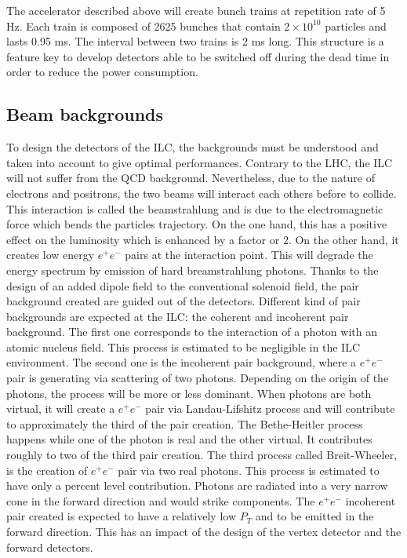     The accelerator described above will create bunch trains at repetition rate of 5 Hz. 
    Each train is composed of 2625 bunches that contain $2\times 10^{10}$ particles and lasts 0.95 ms. 
    The interval between two trains is 2 ms long. 
    This structure is a feature key to develop detectors able to be switched off during the dead time in order to reduce the power consumption.

    \subsection{Beam backgrounds}

    To design the detectors of the \acrshort{ILC}, the backgrounds must be understood and taken into account to give optimal performances.
    Contrary to the \acrshort{LHC}, the \acrshort{ILC} will not suffer from the QCD background.
    Nevertheless, due to the nature of electrons and positrons, the two beams will interact each others before to collide.
    This interaction is called the beamstrahlung and is due to the electromagnetic force which bends the particles trajectory.
    On the one hand, this has a positive effect on the luminosity which is enhanced by a factor or 2.
    On the other hand, it creates low energy $e^+e^-$ pairs at the interaction point. 
    This will degrade the energy spectrum by emission of hard breamstrahlung photons.
    Thanks to the design of an added dipole field to the conventional solenoid field, the pair background created are guided out of the detectors. 
    Different kind of pair backgrounds are expected at the \acrshort{ILC}: the coherent and incoherent pair background.
    The first one corresponds to the interaction of a photon with an atomic nucleus field.
    This process is estimated to be negligible in the \acrshort{ILC} environment.
    The second one is the incoherent pair background, where a $e^+e^-$ pair is generating via scattering of two photons.
    Depending on the origin of the photons, the process will be more or less dominant.
    When photons are both virtual, it will create a $e^+e^-$ pair via Landau-Lifshitz process and will contribute to approximately the third of the pair creation.
    The Bethe-Heitler process happens while one of the photon is real and the other virtual. 
    It contributes roughly to two of the third pair creation.
    The third process called Breit-Wheeler, is the creation of $e^+e^-$ pair via two real photons.
    This process is estimated to have only a percent level contribution.
    Photons are radiated into a very narrow cone in the forward direction and would strike components.
    The $e^+e^-$ incoherent pair created is expected to have a relatively low $P_T$ and to be emitted in the forward direction.
    This has an impact of the design of the vertex detector and the forward detectors.
    

